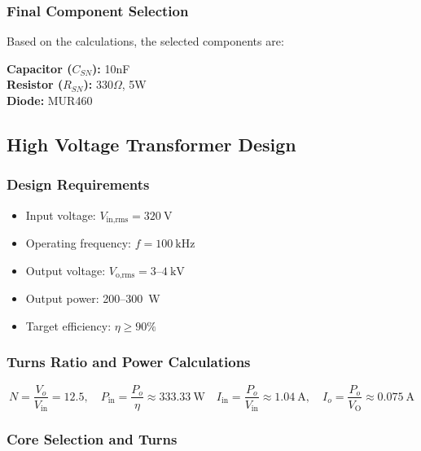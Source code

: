 \subsubsection{Final Component Selection}
Based on the calculations, the selected components are:
\begin{center}

\begin{minipage}{0.4\textwidth}
    \textbf{Capacitor ($C_{SN}$):} 10nF \\
    \textbf{Resistor ($R_{SN}$):} 330$\Omega$, 5W \\
    \textbf{Diode:} MUR460
\end{minipage}

\end{center}

\vspace{10pt}

\subsection{High Voltage Transformer Design}
\label{sec-transformer}

\subsubsection{Design Requirements}
\begin{itemize}
    \item Input voltage: $V_\text{in,rms} = 320~\text{V}$
    \item Operating frequency: $f = 100~\text{kHz}$
    \item Output voltage: $V_\text{o,rms} = 3$--$4~\text{kV}$
    \item Output power: 200--300~W
    \item Target efficiency: $\eta \ge 90\%$
\end{itemize}

\subsubsection{Turns Ratio and Power Calculations}
\[
N = \frac{V_o}{V_\text{in}} = 12.5, \quad P_\text{in} =\frac{P_o}{\eta }\approx 333.33~\text{W}\quad I_\text{in} =\frac{P_o}{V_\text{in}} \approx 1.04~\text{A}, \quad I_o =\frac{P_o}{V_\text{O}} \approx 0.075~\text{A}
\]

\subsubsection{Core Selection and Turns}

